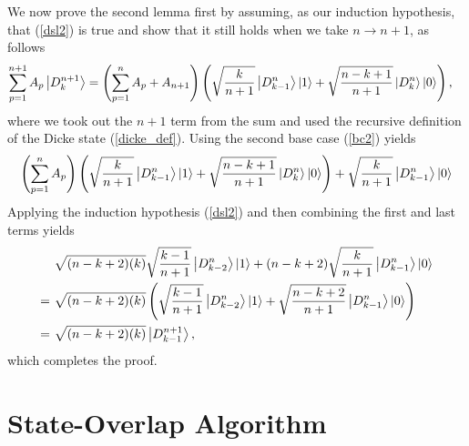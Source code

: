 \documentclass[10pt]{article}
\begin{document}
\begin{appendices}
We now prove the second lemma first by assuming, as our induction hypothesis, that (\ref{dsl2}) is true and show that it still holds when we take $n\to n+1$, as follows
\begin{align}
\sum_{p=1}^{n+1}A_p\ket{D^{n+1}_k}
&=
\left(\sum_{p=1}^{n}A_p + A_{n+1}\right)\left(\sqrt{\frac{k}{n+1}}\ket{D^{n}_{k-1}}\ket{1}+\sqrt{\frac{n-k+1}{n+1}}\ket{D^{n}_k}\ket{0}\right),
\end{align}
where we took out the $n+1$ term from the sum and used the recursive definition of the Dicke state (\ref{dicke_def}).
Using the second base case (\ref{bc2}) yields
\begin{align}
\left(\sum_{p=1}^{n}A_p\right)\left(\sqrt{\frac{k}{n+1}}\ket{D^{n}_{k-1}}\ket{1}+\sqrt{\frac{n-k+1}{n+1}}\ket{D^{n}_k}\ket{0}\right)
+
\sqrt{\frac{k}{n+1}}\ket{D^{n}_{k-1}}\ket{0}
\end{align}
Applying the induction hypothesis (\ref{dsl2}) and then combining the first and last terms yields 
\begin{align}
&
\sqrt{(n-k+2)(k)}\sqrt{\frac{k-1}{n+1}}\ket{D^{n}_{k-2}}\ket{1}
+
(n-k+2)\sqrt{\frac{k}{n+1}}\ket{D^{n}_{k-1}}\ket{0}
\\
= \ &
\sqrt{(n-k+2)(k)}
\left(
\sqrt{\frac{k-1}{n+1}}
\ket{D^{n}_{k-2}}
\ket{1}
+
\sqrt{\frac{n-k+2}{n+1}}
\ket{D^{n}_{k-1}}
\ket{0}
\right)
\\
= \ &
\sqrt{(n-k+2)(k)}\ket{D^{n+1}_{k-1}},
\end{align}
which completes the proof.

\chapter{State-Overlap Algorithm}
\label{appendix:state_overlap_algorithm}


\end{appendices}
\end{document}
